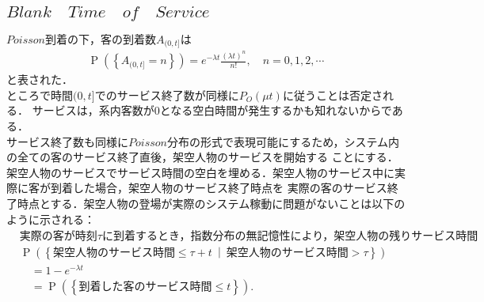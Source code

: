 \documentclass[a4j,papersize,disablejfam,slide,14pt]{jsarticle}
\def\exp#1{e^{#1}} %
\def\prob#1{\operatorname{P} \left(\left\{ #1 \right\}\right)} %
\def\cprob#1#2{\operatorname{P} \left(\left\{ #1 \ \middle|\ #2 \right\}\right)} %
\begin{document}
\subsection{$Blank\quad Time\quad of\quad Service$}
    $Poisson$到着の下，客の到着数$A_{(0, t]}$は
    \begin{align}
    	\prob{A_{(0, t]} = n} = \exp{-\lambda t} \frac{(\lambda t)^n}{n!}, \quad n = 0, 1, 2, \cdots
    \end{align}
    と表された．\\
    ところで時間$(0, t]$でのサービス終了数が同様に$P_O(\mu t)$に従うことは否定される．
    サービスは，系内客数が$0$となる空白時間が発生するかも知れないからである．\\
    サービス終了数も同様に$Poisson$分布の形式で表現可能にするため，システム内の全ての客のサービス終了直後，架空人物のサービスを開始する
    ことにする．架空人物のサービスでサービス時間の空白を埋める．架空人物のサービス中に実際に客が到着した場合，架空人物のサービス終了時点を
    実際の客のサービス終了時点とする．架空人物の登場が実際のシステム稼動に問題がないことは以下のように示される：
    \begin{align}
    	&\mbox{実際の客が時刻$\tau$に到着するとき，指数分布の無記憶性により，架空人物の残りサービス時間も同分布に従う．} \\
    	&\cprob{\mbox{架空人物のサービス時間} \leq \tau + t}{\mbox{架空人物のサービス時間} > \tau} \\
        &\quad= 1 - \exp{-\lambda t} \\
        &\quad= \prob{\mbox{到着した客のサービス時間} \leq t}.
    \end{align}
\end{document}
